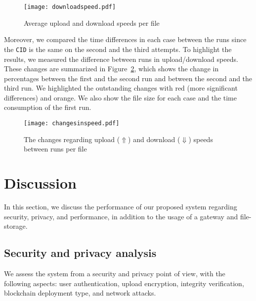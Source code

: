 \documentclass[conference]{IEEEtran}
\begin{document}
\begin{figure}[t]
\centering
\texttt{[image: downloadspeed.pdf]}
\caption{Average upload and download speeds per file}
\label{fig:tikz}
\vspace{-2mm}
\end{figure}


Moreover, we compared the time differences in each case between the runs since the \texttt{CID} is the same on the second and the third attempts. To highlight the results, we measured the difference between runs in upload/download speeds. These changes are summarized in Figure~\ref{fig:sum}, which shows the change in percentages between the first and the second run and between the second and the third run. We highlighted the outstanding changes with red (more significant differences) and orange. We also show the file size for each case and the time consumption of the first run.

\begin{figure}[t]
\centering
\texttt{[image: changesinspeed.pdf]}
\caption{The changes regarding upload ($\Uparrow$) and download ($\Downarrow$) speeds between runs per file}
\label{fig:sum}
\vspace{-2mm}
\end{figure}


\section{Discussion} \label{sec:5}

In this section, we discuss the performance of our proposed system regarding security, privacy, and performance, in addition to the usage of a gateway and file-storage.

\subsection{Security and privacy analysis}
We assess the system from a security and privacy point of view, with the following aspects: user authentication, upload encryption, integrity verification, blockchain deployment type, and network attacks.
\end{document}
